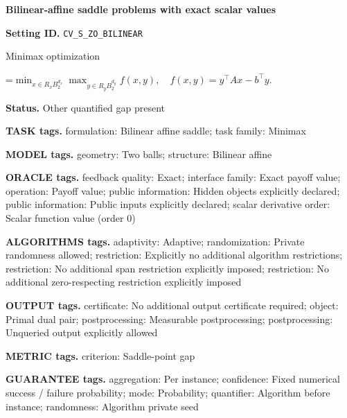\documentclass[10pt,a4paper]{article}
\newcommand{\AtlasMath}[1]{\par\begingroup\centering\setbox0=\hbox{$\displaystyle #1$}\ifdim\wd0>1.4\linewidth\typeout{ATLAS WIDE FORMULA: \the\wd0}\fi\ifdim\wd0>\linewidth\resizebox{\linewidth}{!}{\box0}\else\box0\fi\par\endgroup}
\begin{document}
\raggedright

{\LARGE\bfseries\sffamily\color{AtlasNavy} Bilinear-affine saddle problems with exact scalar values\par}\vspace{5pt}


\textbf{Setting ID.} \texttt{CV\_\allowbreak{}S\_\allowbreak{}ZO\_\allowbreak{}BILINEAR}



Minimax optimization




\AtlasMath{\min_{x\in R_xB_2^{d_x}}\max_{y\in R_yB_2^{d_y}}f(x,y),\quad f(x,y)=y^\top Ax-b^\top y.}




\textbf{Status.} Other quantified gap present



\textbf{TASK tags.} formulation: Bilinear affine saddle; task family: Minimax



\textbf{MODEL tags.} geometry: Two balls; structure: Bilinear affine



\textbf{ORACLE tags.} feedback quality: Exact; interface family: Exact payoff value; operation: Payoff value; public information: Hidden objects explicitly declared; public information: Public inputs explicitly declared; scalar derivative order: Scalar function value (order 0)



\textbf{ALGORITHMS tags.} adaptivity: Adaptive; randomization: Private randomness allowed; restriction: Explicitly no additional algorithm restrictions; restriction: No additional span restriction explicitly imposed; restriction: No additional zero-respecting restriction explicitly imposed



\textbf{OUTPUT tags.} certificate: No additional output certificate required; object: Primal dual pair; postprocessing: Measurable postprocessing; postprocessing: Unqueried output explicitly allowed



\textbf{METRIC tags.} criterion: Saddle-point gap



\textbf{GUARANTEE tags.} aggregation: Per instance; confidence: Fixed numerical success / failure probability; mode: Probability; quantifier: Algorithm before instance; randomness: Algorithm private seed
\end{document}
